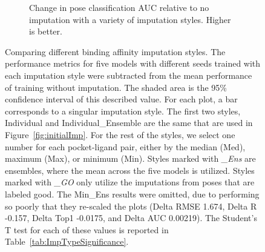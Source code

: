 \documentclass[journal=jmcmar,manuscript=article]{achemso}
\begin{document}
\begin{figure}[tbph]
\begin{subfigure}[t]{0.48\textwidth}
        \caption{Change in pose classification AUC relative to no imputation with a variety of imputation styles. Higher is better.}
    \end{subfigure}
    \caption{Comparing different binding affinity imputation styles. The performance metrics for five models with different seeds trained with each imputation style were subtracted from the mean performance of training without imputation. The shaded area is the 95\% confidence interval of this described value. For each plot, a bar corresponds to a singular imputation style. The first two styles, Individual and Individual\_Ensemble are the same that are used in Figure~\ref{fig:initialImp}. For the rest of the styles, we select one number for each pocket-ligand pair, either by the median (Med), maximum (Max), or minimum (Min). Styles marked with \textit{\_Ens} are ensembles, where the mean across the five models is utilized. Styles marked with \textit{\_GO} only utilize the imputations from poses that are labeled good. The Min\_Ens results were omitted, due to performing so poorly that they re-scaled the plots (Delta RMSE 1.674, Delta R -0.157, Delta Top1 -0.0175, and Delta AUC 0.00219). The Student's T test for each of these values is reported in Table~\ref{tab:ImpTypeSignificance}.}
    \label{fig:compareImp}
\end{figure}
\end{document}
